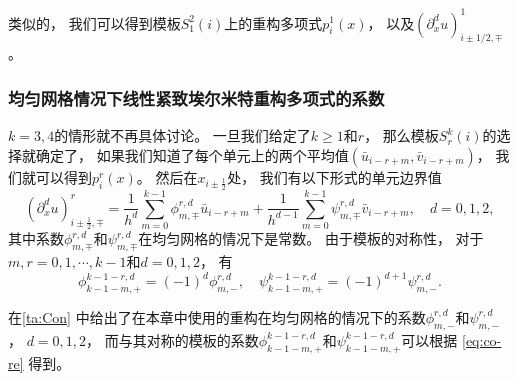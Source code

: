 类似的，
我们可以得到模板$S^2_1(i)$上的重构多项式$p^{1}_{i}(x)$，
以及$({\partial_x^d} u)_{i\pm1 / 2,\mp}^1$。

\subsubsection{均匀网格情况下线性紧致埃尔米特重构多项式的系数}

$k=3,4$的情形就不再具体讨论。
一旦我们给定了$k \ge 1$和$r$，
那么模板$S^k_r(i)$的选择就确定了，
如果我们知道了每个单元上的两个平均值$(\bar u_{i-r+m},\bar v_{i-r+m})$，
我们就可以得到$p^r_i(x)$。
然后在$x_{i\pm\frac 12}$处，
我们有以下形式的单元边界值
\begin{equation}
  \label{eq:Con}
  ({\partial_x^d} u)_{i\pm \frac 12,\mp}^{r} = \frac{1}{h^d}\sum_{m=0}^{k-1} \phi_{m,\mp}^{r,d} \bar{u}_{i-r+m}+ \frac{1}{h^{d-1}}\sum_{m=0}^{k-1} \psi_{m,\mp}^{r,d} \bar v_{i-r+m},\quad d=0,1,2,
\end{equation}
其中系数$\phi^{r,d}_{m,\mp}$和$\psi^{r,d}_{m,\mp}$在均匀网格的情况下是常数。
由于模板的对称性，
对于$m,r=0,1,\cdots,k-1$和$d=0,1,2$，
有
\begin{equation}
  \label{eq:co-re}
  \phi_{k-1-m,+}^{k-1-r,d} = (-1)^d \phi_{m,-}^{r,d},
  \quad \psi_{k-1-m,+}^{k-1-r,d} = (-1)^{d+1} \psi_{m,-}^{r,d}.
\end{equation}

在\cref{ta:Con} 中给出了在本章中使用的重构在均匀网格的情况下的系数$\phi^{r,d}_{m,-}$和$\psi^{r,d}_{m,-}$，
$d=0,1,2$，
而与其对称的模板的系数$\phi^{k-1-r,d}_{k-1-m,+}$和$\psi^{k-1-r,d}_{k-1-m,+}$可以根据 \cref{eq:co-re} 得到。

